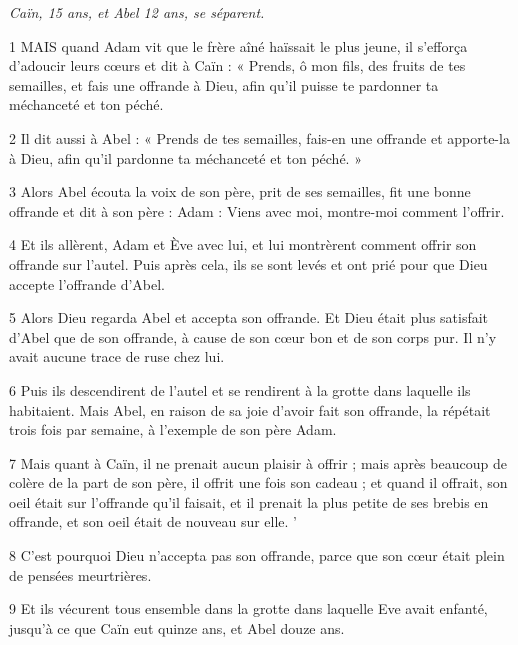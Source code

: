 
\par \textit{Caïn, 15 ans, et Abel 12 ans, se séparent.}

\par 1 MAIS quand Adam vit que le frère aîné haïssait le plus jeune, il s'efforça d'adoucir leurs cœurs et dit à Caïn : « Prends, ô mon fils, des fruits de tes semailles, et fais une offrande à Dieu, afin qu'il puisse te pardonner ta méchanceté et ton péché.

\par 2 Il dit aussi à Abel : « Prends de tes semailles, fais-en une offrande et apporte-la à Dieu, afin qu'il pardonne ta méchanceté et ton péché. »

\par 3 Alors Abel écouta la voix de son père, prit de ses semailles, fit une bonne offrande et dit à son père : Adam : Viens avec moi, montre-moi comment l'offrir.

\par 4 Et ils allèrent, Adam et Ève avec lui, et lui montrèrent comment offrir son offrande sur l'autel. Puis après cela, ils se sont levés et ont prié pour que Dieu accepte l'offrande d'Abel.

\par 5 Alors Dieu regarda Abel et accepta son offrande. Et Dieu était plus satisfait d'Abel que de son offrande, à cause de son cœur bon et de son corps pur. Il n’y avait aucune trace de ruse chez lui.

\par 6 Puis ils descendirent de l'autel et se rendirent à la grotte dans laquelle ils habitaient. Mais Abel, en raison de sa joie d'avoir fait son offrande, la répétait trois fois par semaine, à l'exemple de son père Adam.

\par 7 Mais quant à Caïn, il ne prenait aucun plaisir à offrir ; mais après beaucoup de colère de la part de son père, il offrit une fois son cadeau ; et quand il offrait, son oeil était sur l'offrande qu'il faisait, et il prenait la plus petite de ses brebis en offrande, et son oeil était de nouveau sur elle. '

\par 8 C'est pourquoi Dieu n'accepta pas son offrande, parce que son cœur était plein de pensées meurtrières.

\par 9 Et ils vécurent tous ensemble dans la grotte dans laquelle Eve avait enfanté, jusqu'à ce que Caïn eut quinze ans, et Abel douze ans.

